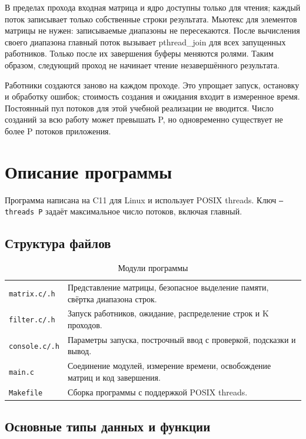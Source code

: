 \documentclass[12pt,a4paper]{article}
\begin{document}
В пределах прохода входная матрица и ядро доступны только для чтения; каждый поток записывает только собственные строки результата. Мьютекс для элементов матрицы не нужен: записываемые диапазоны не пересекаются. После вычисления своего диапазона главный поток вызывает pthread\_join для всех запущенных работников. Только после их завершения буферы меняются ролями. Таким образом, следующий проход не начинает чтение незавершённого результата.

Работники создаются заново на каждом проходе. Это упрощает запуск, остановку и обработку ошибок; стоимость создания и ожидания входит в измеренное время. Постоянный пул потоков для этой учебной реализации не вводится. Число созданий за всю работу может превышать P, но одновременно существует не более P потоков приложения.

\section{Описание программы}

Программа написана на C11 для Linux и использует POSIX threads. Ключ \texttt{--threads P} задаёт максимальное число потоков, включая главный.

\subsection{Структура файлов}

\begin{table}[H]
\caption{Модули программы}
\begin{tabularx}{\linewidth}{|P{3.1cm}|L|}\hline
{} &  \tabularnewline \hline
\texttt{matrix.c/.h} & Представление матрицы, безопасное выделение памяти, свёртка диапазона строк. \\ \hline
\texttt{filter.c/.h} & Запуск работников, ожидание, распределение строк и K проходов. \\ \hline
\texttt{console.c/.h} & Параметры запуска, построчный ввод с проверкой, подсказки и вывод. \\ \hline
\texttt{main.c} & Соединение модулей, измерение времени, освобождение матриц и код завершения. \\ \hline
\texttt{Makefile} & Сборка программы с поддержкой POSIX threads. \\ \hline
\end{tabularx}
\end{table}

\subsection{Основные типы данных и функции}
\end{document}
